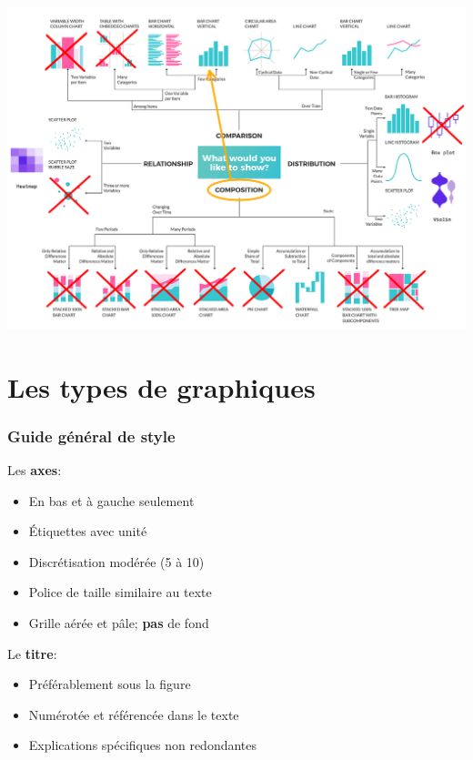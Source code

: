 \documentclass[aspectratio=169]{beamer}
\begin{document}
\begin{frame}[c]
    
\includegraphics[height=\paperheight]{figures/types_of_charts_sorted.png}

\end{frame}






\section{Les types de graphiques}
\label{sec:les_types_de_graphiques}


\begin{frame}[c]\frametitle{Guide général de style}

Les \textbf{axes}:
\vspace{-\parskip}
\begin{itemize}
	\item En bas et à gauche seulement
	\item Étiquettes avec unité
	\item Discrétisation modérée (5 à 10)
	\item Police de taille similaire au texte
	\item Grille aérée et pâle; \textbf{pas} de fond
\end{itemize}

Le \textbf{titre}:
\vspace{-\parskip}
\begin{itemize}
	\item Préférablement sous la figure
	\item Numérotée et référencée dans le texte
	\item Explications spécifiques non redondantes
\end{itemize}

\end{frame}
\end{document}
